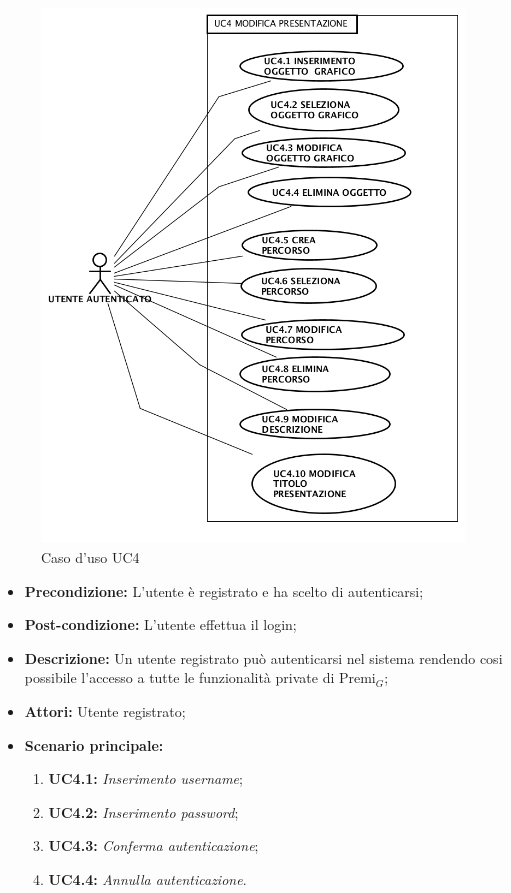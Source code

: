 \begin{figure}[h]
	\begin{center}
	\includegraphics[scale=0.4]{diagram/UC4.png}
	\caption{Caso d'uso UC4}
	\end{center}
\end{figure}
\begin{itemize}
	\item \textbf{Precondizione:} L'utente è registrato e ha scelto di autenticarsi;
	\item \textbf{Post-condizione:} L'utente effettua il login;
	\item \textbf{Descrizione:} Un utente registrato può autenticarsi nel sistema rendendo cosi possibile l'accesso a tutte le funzionalità private di Premi$_G$;
	\item \textbf{Attori:} Utente registrato;
	\item \textbf{Scenario principale:}
	\begin{enumerate}
		\item \textbf{ UC4.1:} \textit{ Inserimento username};
		\item \textbf{ UC4.2:} \textit{ Inserimento password};
		\item \textbf{ UC4.3:} \textit{ Conferma autenticazione};
		\item \textbf{ UC4.4:} \textit{ Annulla autenticazione}.
	\end{enumerate}
\end{itemize}
